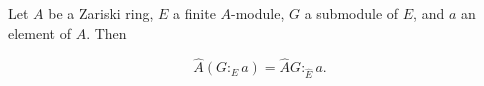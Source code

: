 Let $A$ be a Zariski ring, $E$ a finite $A$-module, $G$ a submodule of $E$, and $a$ an element of $A$. Then

$$\hat{A}(G :_E a) = \hat{A}G :_{\hat{E}} a.$$